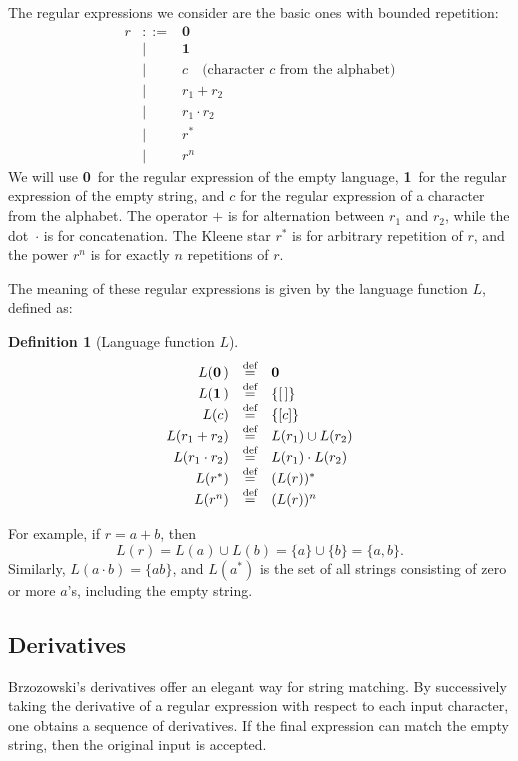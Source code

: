 \documentclass[12pt]{article}
\newtheorem{definition}{Definition} %
\newcommand{\dn}{\ensuremath{\stackrel{\mbox{\scriptsize def}}{=}}}
\newcommand{\ZERO}{\textbf{0}}
\newcommand{\ONE}{\textbf{1}}
\newcommand{\emptylist}{[\,]}
\begin{document}
The regular expressions we consider are the basic ones with bounded repetition:
\[
\begin{array}{rcl}
r &::=& \ZERO  \\
  &\mid& \ONE \\
  &\mid& c \quad\text{(character $c$ from the alphabet)} \\
  &\mid& r_1 + r_2 \\
  &\mid& r_1 \cdot r_2  \\
  &\mid& r^* \\
  &\mid& r^n 
\end{array}
\]
We will use \ZERO\ for the regular expression of the empty language, \ONE\ for
the regular expression of the empty string, and $c$ for the regular expression
of a character from the alphabet. The operator $+$ is for alternation between
$r_1$ and $r_2$, while the dot~$\cdot$ is for concatenation. The Kleene star
$r^\ast$ is for arbitrary repetition of $r$, and the power $r^n$ is for exactly
$n$ repetitions of $r$.


The meaning of these regular expressions is given by the language function $L$, defined as:
\begin{definition}[Language function $L$]\mbox{}
  \[
\begin{array}{rcl}
L(\ZERO\,) &\dn& \ZERO \\
L(\ONE\,) &\dn& \{\emptylist\} \\
L(c) &\dn& \{[c]\} \\
L(r_1 + r_2) &\dn& L(r_1) \cup L(r_2) \\
L(r_1 \cdot r_2) &\dn& L(r_1) \cdot L(r_2) \\
L(r^\ast) &\dn& (L(r))^\ast \\
L(r^n) &\dn& (L(r))^n
\end{array}
\]
\end{definition}

For example, if $r = a + b$, then
\[
L(r) = L(a) \cup L(b) = \{a\} \cup \{b\} = \{a, b\}.
\]
Similarly, $L(a \cdot b) = \{ab\}$, and $L(a^*)$ is the set of all strings
consisting of zero or more $a$'s, including the empty string.


\subsection{Derivatives}

Brzozowski’s derivatives offer an elegant way for string matching. By successively taking the derivative of a regular
expression with respect to each input character, one obtains a sequence of derivatives. If the final expression can match 
the empty string, then the original input is accepted.
\end{document}
